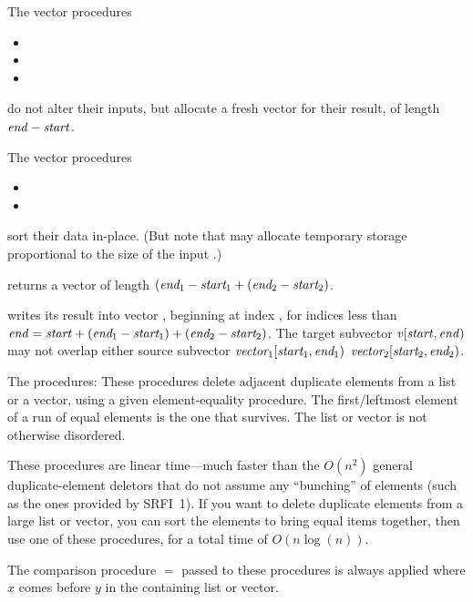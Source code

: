The vector procedures
%
\begin{itemize}
\item {}
\item {}
\item {}
\end{itemize}
%
do not alter their inputs, but allocate a fresh vector for their result,
of length $\var{end} - \var{start}$. 

The vector procedures
%
\begin{itemize}
\item {}
\item {}
\end{itemize}
%
sort their data in-place. (But note that 
may allocate temporary storage proportional to the size of the
input
.)

 returns a vector of length $(\var{end$_1$}-\var{start$_1$}+(\var{end$_2$}-\var{start$_2$})$.
    
 writes its result into vector ,
beginning at index , for indices less than \(\var{end} =
\var{start} + (\var{end$_1$}-\var{start$_1$}) +
(\var{end$_2$}-\var{start$_2$})\). The target subvector
  $\var{v}[\var{start},\var{end})$ may not overlap either source
subvector $\var{vector$_1$}[\var{start$_1$},\var{end$_1$})$ $\var{vector$_2$}[\var{start$_2$},\var{end$_2$})$.

The  procedures:
These procedures delete adjacent duplicate elements from a list or a
vector, using a given element-equality procedure. The first/leftmost
element of a run of equal elements is the one that survives. The list or
vector is not otherwise disordered.
    
These procedures are linear time---much faster than the $O(n^2)$ general
duplicate-element deletors that do not assume any ``bunching'' of elements
(such as the ones provided by SRFI~1). If you want to delete duplicate
elements from a large list or vector, you can sort the elements to bring
equal items together, then use one of these procedures, for a total time
of $O(n\log(n))$.
    
The comparison procedure \(=\) passed to these procedures is always
applied
%
%
where $x$ comes before $y$ in the containing list or vector.

